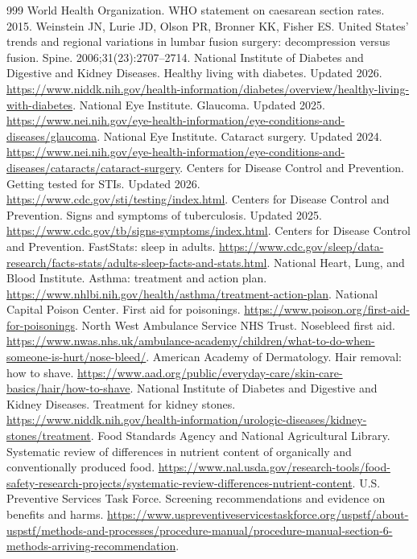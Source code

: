 \documentclass[11pt,oneside]{book}
\begin{document}
\begin{thebibliography}{999}
World Health Organization. WHO statement on caesarean section rates. 2015.
Weinstein JN, Lurie JD, Olson PR, Bronner KK, Fisher ES. United States' trends and regional variations in lumbar fusion surgery: decompression versus fusion. Spine. 2006;31(23):2707--2714.
National Institute of Diabetes and Digestive and Kidney Diseases. Healthy living with diabetes. Updated 2026. \url{https://www.niddk.nih.gov/health-information/diabetes/overview/healthy-living-with-diabetes}.
National Eye Institute. Glaucoma. Updated 2025. \url{https://www.nei.nih.gov/eye-health-information/eye-conditions-and-diseases/glaucoma}.
National Eye Institute. Cataract surgery. Updated 2024. \url{https://www.nei.nih.gov/eye-health-information/eye-conditions-and-diseases/cataracts/cataract-surgery}.
Centers for Disease Control and Prevention. Getting tested for STIs. Updated 2026. \url{https://www.cdc.gov/sti/testing/index.html}.
Centers for Disease Control and Prevention. Signs and symptoms of tuberculosis. Updated 2025. \url{https://www.cdc.gov/tb/signs-symptoms/index.html}.
Centers for Disease Control and Prevention. FastStats: sleep in adults. \url{https://www.cdc.gov/sleep/data-research/facts-stats/adults-sleep-facts-and-stats.html}.
National Heart, Lung, and Blood Institute. Asthma: treatment and action plan. \url{https://www.nhlbi.nih.gov/health/asthma/treatment-action-plan}.
National Capital Poison Center. First aid for poisonings. \url{https://www.poison.org/first-aid-for-poisonings}.
North West Ambulance Service NHS Trust. Nosebleed first aid. \url{https://www.nwas.nhs.uk/ambulance-academy/children/what-to-do-when-someone-is-hurt/nose-bleed/}.
American Academy of Dermatology. Hair removal: how to shave. \url{https://www.aad.org/public/everyday-care/skin-care-basics/hair/how-to-shave}.
National Institute of Diabetes and Digestive and Kidney Diseases. Treatment for kidney stones. \url{https://www.niddk.nih.gov/health-information/urologic-diseases/kidney-stones/treatment}.
Food Standards Agency and National Agricultural Library. Systematic review of differences in nutrient content of organically and conventionally produced food. \url{https://www.nal.usda.gov/research-tools/food-safety-research-projects/systematic-review-differences-nutrient-content}.
U.S. Preventive Services Task Force. Screening recommendations and evidence on benefits and harms. \url{https://www.uspreventiveservicestaskforce.org/uspstf/about-uspstf/methods-and-processes/procedure-manual/procedure-manual-section-6-methods-arriving-recommendation}.

\end{thebibliography}
\end{document}
